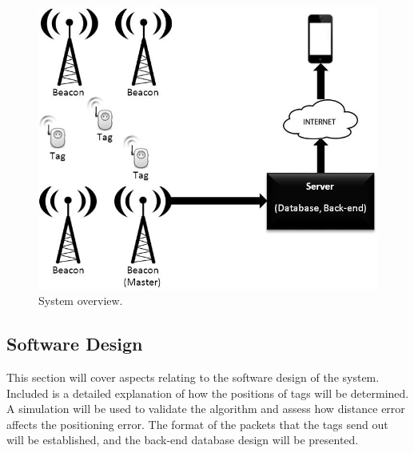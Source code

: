 \begin{figure}[H]
\begin{center}
\includegraphics[scale=0.5]{data/software/1.jpg}
\caption{System overview.}
\label{fig:soft-overview}
\end{center}
\end{figure}

\newpage
\subsection{Software Design}
This section will cover aspects relating to the software design of the system. Included is a detailed explanation of how the positions of tags will be determined. A simulation will be used to validate the algorithm and assess how distance error affects the positioning error. The format of the packets that the tags send out will be established, and the back-end database design will be presented.

